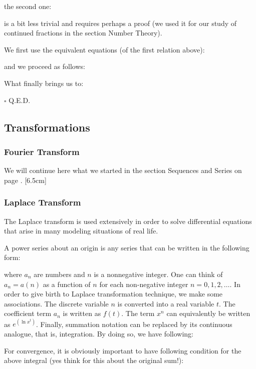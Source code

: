 	the second one:
	
	is a bit less trivial and requires perhaps a proof (we used it for our study of continued fractions in the section Number Theory).
	\begin{dem}
	We first use the equivalent equations (of the first relation above):
	
	and we proceed as follows:
	
	What finally brings us to:
	
	\begin{flushright}
		$\square$  Q.E.D.
	\end{flushright}
	\end{dem}

	\pagebreak
	\subsection{Transformations}
	\subsubsection{Fourier Transform}
	We will continue here what we started in the section Sequences and Series on page \pageref{fourier transform}.
	[6.5cm]
	
	\subsubsection{Laplace Transform}
	The Laplace transform is used extensively  in order to solve  differential equations that arise in many modeling situations of real life. 

	A power series about an origin is any series that can be written in the following form:

	where $a_n$ are  numbers and $n$ is a nonnegative integer. One can think of $a_n = a(n)$ as a function of $n$ for each non-negative integer $n = 0, 1, 2, \ldots$. In order to give birth to Laplace transformation technique, we  make some associations. The discrete variable $n$ is converted into a real variable $t$. The coefficient term $a_n$ is written as $f(t)$. The term $x^n$ can equivalently be written as $e^{(\ln x^t)}$. Finally, summation notation can be replaced by its continuous analogue, that is, integration. By doing so, we have following:
	 
For convergence, it is obviously important to have following condition for the above integral (yes think for this about the original sum!):
	 
